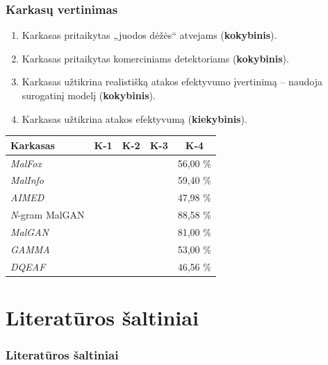 \documentclass[12pt]{beamer}
\newcommand{\enquote}[1]{„#1“}
\newcommand{\cmark}{\ding{51}}%
\newcommand{\xmark}{\ding{55}}%
\newenvironment{criteriaTable}{
    \newcommand{\rowLast}[1]{##1}
    \newcommand{\row}[1]{##1 \\}
    \newcommand{\tbl}[1]{\gdef\Table{##1}}

    \def\Table{}
}{
    \begin{table}[h]
        \centering
        \begin{tabular}{l|c|c|c|S}
            \row{
            \textbf{Karkasas} & 
            \textbf{K-1}      & 
            \textbf{K-2}      & 
            \textbf{K-3}      & 
                \textbf{K-4}
            } \midrule
            \Table{}
        \end{tabular}
    \end{table}
}
\begin{document}
\begin{frame}
    \frametitle{Karkasų vertinimas}
    \begin{enumerate}[K-1.]
        \item Karkasas pritaikytas \enquote{juodos dėžės} atvejams (\textbf{kokybinis}).
        \item Karkasas pritaikytas komerciniams detektoriams (\textbf{kokybinis}).
        \item Karkasas užtikrina realistišką atakos efektyvumo įvertinimą -- naudoja
              surogatinį modelį (\textbf{kokybinis}).
        \item Karkasas užtikrina atakos efektyvumą (\textbf{kiekybinis}).
    \end{enumerate}\pause

    \begin{criteriaTable}
        \tbl{
            \row{ \textit{MalFox}        & \cmark{} & \cmark{} & \cmark{} & 56,00 \;\%}
            \row{ \textit{MalInfo}       & \cmark{} & \cmark{} & \xmark{} & 59,40 \;\%}
            \row{ \textit{AIMED}         & \cmark{} & \cmark{} & \xmark{} & 47,98 \;\%}
            \row{ \textit{N}-gram MalGAN & \cmark{} & \xmark{} & \cmark{} & 88,58 \;\%}
            \row{ \textit{MalGAN}        & \cmark{} & \xmark{} & \cmark{} & 81,00 \;\%}
            \row{ \textit{GAMMA}         & \cmark{} & \xmark{} & \xmark{} & 53,00 \;\%}
            \rowLast{ \textit{DQEAF}     & \cmark{} & \xmark{} & \xmark{} & 46,56 \;\%}
        }
    \end{criteriaTable}

\end{frame}

\section{Literatūros šaltiniai}
\begin{frame}[t,allowframebreaks]
    \frametitle{Literatūros šaltiniai}
    \printbibliography
\end{frame}
\end{document}
